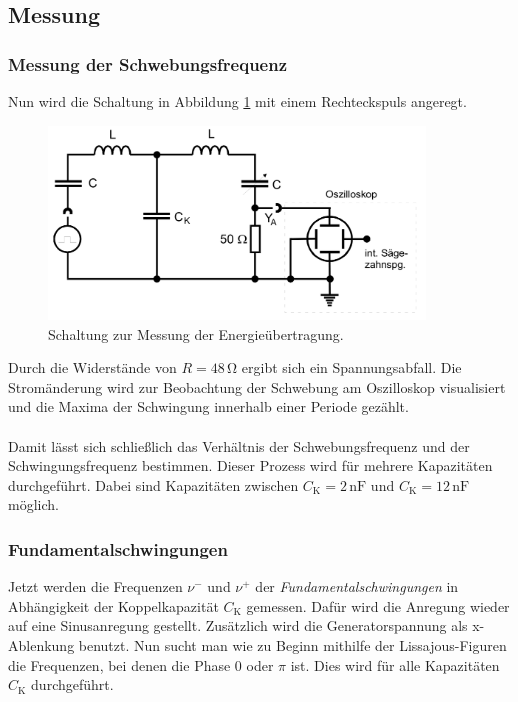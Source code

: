 \subsection{Messung}
\subsubsection*{Messung der Schwebungsfrequenz}

Nun wird die Schaltung in Abbildung \ref{fig:schwebeschaltung} mit einem Rechteckspuls angeregt.

\begin{figure} [H]
    \centering
    \includegraphics[width=10cm] {pictures/schwebeschaltung.png} 
    \caption{Schaltung zur Messung der Energieübertragung. \cite{v355}}
    \label{fig:schwebeschaltung}
\end{figure} 

Durch die Widerstände von $R = 48 \,\unit{\ohm}$ ergibt sich ein Spannungsabfall.
Die Stromänderung wird zur Beobachtung der Schwebung am Oszilloskop visualisiert und
die Maxima der Schwingung innerhalb einer Periode gezählt.\\
\\
Damit lässt sich schließlich das Verhältnis der Schwebungsfrequenz und der Schwingungsfrequenz bestimmen.
Dieser Prozess wird für mehrere Kapazitäten durchgeführt.
Dabei sind Kapazitäten zwischen $C_{\text{K}} = 2 \,\unit{\nano\farad}$ und $C_{\text{K}} = 12 \,\unit{\nano\farad}$ möglich.


\subsubsection*{Fundamentalschwingungen}

Jetzt werden die Frequenzen $\nu^{-}$ und $\nu^{+}$ der \textit{Fundamentalschwingungen} in 
Abhängigkeit der Koppelkapazität $C_{\text{K}}$ gemessen.
Dafür wird die Anregung wieder auf eine Sinusanregung gestellt.
Zusätzlich wird die Generatorspannung als x-Ablenkung benutzt.
Nun sucht man wie zu Beginn mithilfe der Lissajous-Figuren die Frequenzen, bei denen die Phase 0 oder $\pi$ ist.
Dies wird für alle Kapazitäten $C_{\text{K}}$ durchgeführt.

